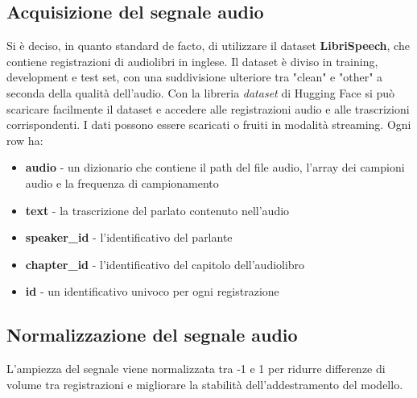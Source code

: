 \documentclass[12pt, a4paper]{article}
\begin{document}
\subsection{Acquisizione del segnale audio}
Si è deciso, in quanto standard de facto, di utilizzare il dataset \textbf{LibriSpeech}, che contiene registrazioni di audiolibri in inglese. Il dataset è diviso in training, development e test set, con una suddivisione ulteriore tra "clean" e "other" a seconda della qualità dell'audio.
Con la libreria \emph{dataset} di Hugging Face si può scaricare facilmente il dataset e accedere alle registrazioni audio e alle trascrizioni corrispondenti. I dati possono essere scaricati o fruiti in modalità streaming. Ogni row ha:
\begin{itemize}
  \item \textbf{audio} - un dizionario che contiene il path del file audio, l'array dei campioni audio e la frequenza di campionamento
  \item \textbf{text} - la trascrizione del parlato contenuto nell'audio
  \item \textbf{speaker\_id} - l'identificativo del parlante
  \item \textbf{chapter\_id} - l'identificativo del capitolo dell'audiolibro
  \item \textbf{id} - un identificativo univoco per ogni registrazione
\end{itemize}

\subsection{Normalizzazione del segnale audio}
L’ampiezza del segnale viene normalizzata tra -1 e 1 per ridurre differenze di volume tra registrazioni e migliorare la stabilità dell’addestramento del modello.
\end{document}
